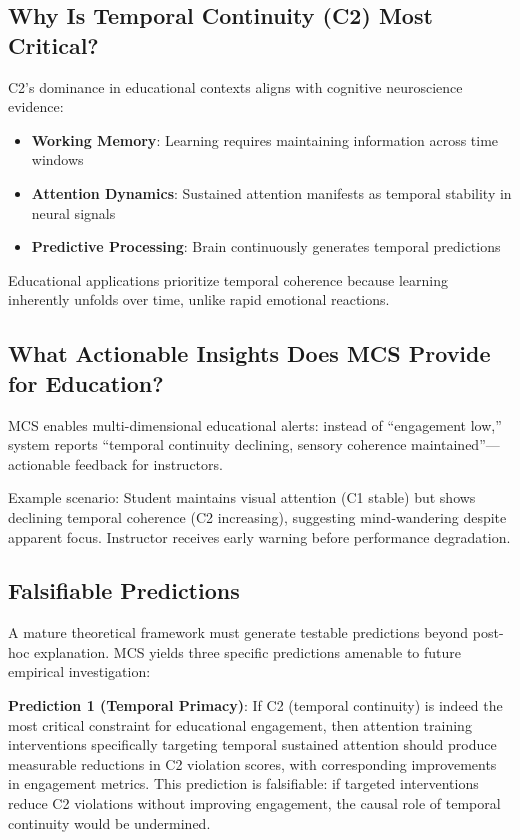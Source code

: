 \documentclass[10pt,journal,compsoc]{IEEEtran}
\begin{document}
\subsection{Why Is Temporal Continuity (C2) Most Critical?}

C2's dominance in educational contexts aligns with cognitive neuroscience evidence:

\begin{itemize}
    \item \textbf{Working Memory}: Learning requires maintaining information across time windows~\cite{sweller2019}
    \item \textbf{Attention Dynamics}: Sustained attention manifests as temporal stability in neural signals~\cite{eeg-engagement}
    \item \textbf{Predictive Processing}: Brain continuously generates temporal predictions~\cite{friston2010}
\end{itemize}

Educational applications prioritize temporal coherence because learning inherently unfolds over time, unlike rapid emotional reactions.

\subsection{What Actionable Insights Does MCS Provide for Education?}

MCS enables multi-dimensional educational alerts: instead of ``engagement low,'' system reports ``temporal continuity declining, sensory coherence maintained''—actionable feedback for instructors.

Example scenario: Student maintains visual attention (C1 stable) but shows declining temporal coherence (C2 increasing), suggesting mind-wandering despite apparent focus. Instructor receives early warning before performance degradation.

\subsection{Falsifiable Predictions}

A mature theoretical framework must generate testable predictions beyond post-hoc explanation. MCS yields three specific predictions amenable to future empirical investigation:

\textbf{Prediction 1 (Temporal Primacy)}: If C2 (temporal continuity) is indeed the most critical constraint for educational engagement, then attention training interventions specifically targeting temporal sustained attention should produce measurable reductions in C2 violation scores, with corresponding improvements in engagement metrics. This prediction is falsifiable: if targeted interventions reduce C2 violations without improving engagement, the causal role of temporal continuity would be undermined.
\end{document}
